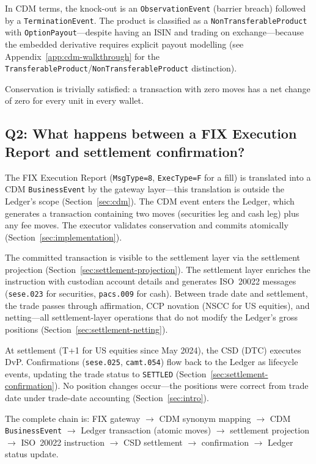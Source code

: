 \documentclass[11pt,a4paper]{article}
\begin{document}
\noindent In CDM terms, the knock-out is an \texttt{ObservationEvent} (barrier breach) followed by a \texttt{TerminationEvent}. The product is classified as a \texttt{NonTransferableProduct} with \texttt{OptionPayout}---despite having an ISIN and trading on exchange---because the embedded derivative requires explicit payout modelling (see Appendix~\ref{app:cdm-walkthrough} for the \texttt{TransferableProduct}/\texttt{NonTransferableProduct} distinction).

Conservation is trivially satisfied: a transaction with zero moves has a net change of zero for every unit in every wallet.

\subsection*{Q2: What happens between a FIX Execution Report and settlement confirmation?}

The FIX Execution Report (\texttt{MsgType=8}, \texttt{ExecType=F} for a fill) is translated into a CDM \texttt{BusinessEvent} by the gateway layer---this translation is outside the Ledger's scope (Section~\ref{sec:cdm}). The CDM event enters the Ledger, which generates a transaction containing two moves (securities leg and cash leg) plus any fee moves. The executor validates conservation and commits atomically (Section~\ref{sec:implementation}).

The committed transaction is visible to the settlement layer via the settlement projection (Section~\ref{sec:settlement-projection}). The settlement layer enriches the instruction with custodian account details and generates ISO~20022 messages (\texttt{sese.023} for securities, \texttt{pacs.009} for cash). Between trade date and settlement, the trade passes through affirmation, CCP novation (NSCC for US equities), and netting---all settlement-layer operations that do not modify the Ledger's gross positions (Section~\ref{sec:settlement-netting}).

At settlement (T+1 for US equities since May 2024), the CSD (DTC) executes DvP. Confirmations (\texttt{sese.025}, \texttt{camt.054}) flow back to the Ledger as lifecycle events, updating the trade status to \texttt{SETTLED} (Section~\ref{sec:settlement-confirmation}). No position changes occur---the positions were correct from trade date under trade-date accounting (Section~\ref{sec:intro}).

The complete chain is: FIX gateway $\to$ CDM synonym mapping $\to$ CDM \texttt{BusinessEvent} $\to$ Ledger transaction (atomic moves) $\to$ settlement projection $\to$ ISO~20022 instruction $\to$ CSD settlement $\to$ confirmation $\to$ Ledger status update.
\end{document}
